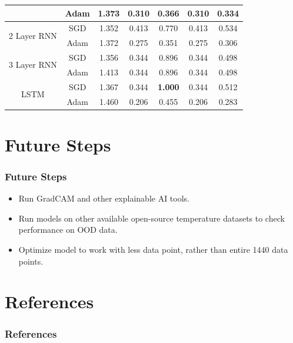 \documentclass[pdf, 9pt]{beamer}
\begin{document}
\begin{frame}
\begin{table}[]
{\begin{tabular}{|c|c|c|c|c|c|c|}
				& Adam & 1.373          & 0.310          & 0.366          & 0.310          & 0.334          \\ \hline
				\multirow{2}{*}{2 Layer RNN}                    & SGD  & 1.352          & 0.413          & 0.770          & 0.413          & 0.534          \\
				& Adam & 1.372          & 0.275          & 0.351          & 0.275          & 0.306          \\ \hline
				\multirow{2}{*}{3 Layer RNN}                    & SGD  & 1.356          & 0.344          & 0.896          & 0.344          & 0.498          \\
				& Adam & 1.413          & 0.344          & 0.896          & 0.344          & 0.498          \\ \hline
				\multirow{2}{*}{LSTM}                           & SGD  & 1.367          & 0.344          & \textbf{1.000} & 0.344          & 0.512          \\
				& Adam & 1.460          & 0.206          & 0.455          & 0.206          & 0.283          \\ \hline
			\end{tabular}%
		}
		\label{model_testing_metrics}
		\end{table}
	\end{frame}
	
	\section{Future Steps}
	\begin{frame}
		\frametitle{Future Steps}
		\begin{itemize}
			\item Run GradCAM and other explainable AI tools.
			\item Run models on other available open-source temperature datasets to check performance on OOD data.
			\item Optimize model to work with less data point, rather than entire 1440 data points.
		\end{itemize}
	\end{frame}
	
	\section{References}
	\begin{frame}
		\frametitle{References}
		
		
		\nocite{*}
	\end{frame}
	
\end{document}
